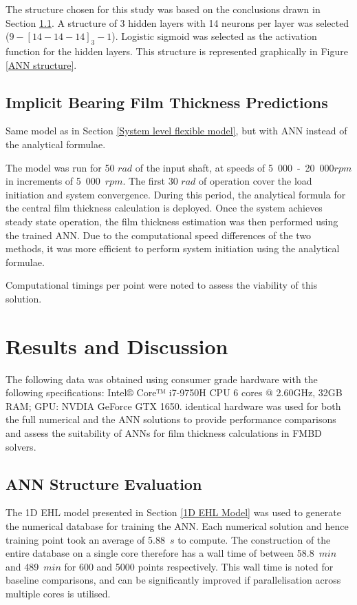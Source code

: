 The structure chosen for this study was based on the conclusions drawn in Section \ref{ANN Structure Evaluation Results}. A structure of 3 hidden layers with 14 neurons per layer was selected ($9-[14-14-14]_3-1$). Logistic sigmoid was selected as the activation function for the hidden layers. This structure is represented graphically in Figure \ref{ANN structure}.


\subsection{Implicit Bearing Film Thickness Predictions}

Same model as in Section \ref{System level flexible model}, but with ANN instead of the analytical formulae. 

The model was run for 50 $rad$ of the input shaft, at speeds of 5~000~-~20~000$rpm$ in increments of 5~000~$rpm$. The first 30 $rad$ of operation cover the load initiation and system convergence. During this period, the analytical formula for the central film thickness calculation is deployed. Once the system achieves steady state operation, the film thickness estimation was then performed using the trained ANN. Due to the computational speed differences of the two methods, it was more efficient to perform system initiation using the analytical formulae.

Computational timings per point were noted to assess the viability of this solution.


\section{Results and Discussion}

The following data was obtained using consumer grade hardware with the following specifications: 
Intel® Core™ i7-9750H CPU 6 cores @ 2.60GHz, 32GB RAM; GPU: NVDIA GeForce GTX 1650. identical hardware was used for both the full numerical and the ANN solutions to provide performance comparisons and assess the suitability of ANNs for film thickness calculations in FMBD solvers.

\subsection{ANN Structure Evaluation} \label{ANN Structure Evaluation Results}

The 1D EHL model presented in Section \ref{1D EHL Model} was used to generate the numerical database for training the ANN. Each numerical solution and hence training point took an average of 5.88~$s$ to compute. The construction of the entire database on a single core therefore has a wall time of between 58.8~$min$ and 489~$min$ for 600 and 5000 points respectively. This wall time is noted for baseline comparisons, and can be significantly improved if parallelisation across multiple cores is utilised.

